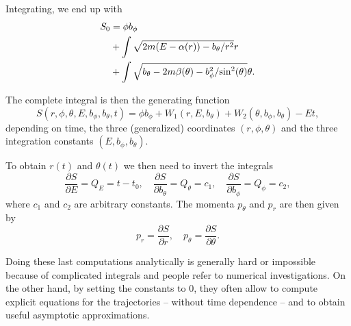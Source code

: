 \documentclass[english,fontsize=11pt,paper=a5,oneside]{scrbook}
\let\d\relax
\DeclareMathOperator{\d}{d}
\theoremstyle{definition}
\newenvironment{example}
  {\pushQED{\qed}\renewcommand{\qedsymbol}{$\lozenge$}\examplex}
  {\popQED\endexamplex}
\begin{document}
\begin{example}
    Integrating, we end up with
    \begin{align}
        S_0 &= \phi b_\phi \\
          &+ \int\sqrt{2m(E-\alpha(r))-{b_\theta}/{r^2}}\d r \\
          &+ \int\sqrt{b_\theta-2m\beta(\theta)-{b_\phi^2}/{\sin^2(\theta)}}\d \theta.\\
    \end{align}

    The complete integral is then the generating function
    \begin{equation}
        S(r,\phi,\theta,E,b_\phi,b_\theta,t) =
        \phi b_\phi
        + W_1(r, E, b_\theta)
        + W_2(\theta, b_\phi, b_\theta)
        - E t,
    \end{equation}
    depending on time, the three (generalized) coordinates $(r,\phi,\theta)$ and the three integration constants $(E,b_\phi,b_\theta)$.

    To obtain $r(t)$ and $\theta(t)$ we then need to invert the integrals
    \begin{equation}
        \frac{\partial S}{\partial E} = Q_E = t-t_0, \quad
        \frac{\partial S}{\partial b_\theta} = Q_\theta = c_1, \quad
        \frac{\partial S}{\partial b_\phi} = Q_\phi = c_2,
    \end{equation}
    where $c_1$ and $c_2$ are arbitrary constants.
    The momenta $p_\theta$ and $p_r$ are then given by
    \begin{equation}
        p_r = \frac{\partial S}{\partial r}, \quad
        p_\theta = \frac{\partial S}{\partial \theta}.
    \end{equation}

    Doing these last computations analytically is generally hard or impossible because of complicated integrals and people refer to numerical investigations.
    On the other hand, by setting the constants to $0$, they often allow to compute explicit equations for the trajectories -- without time dependence -- and to obtain useful asymptotic approximations.
\end{example}
\end{document}
